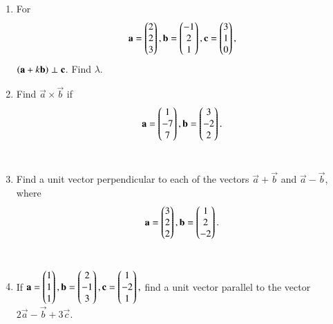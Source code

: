 \begin{enumerate}[label=\arabic*.,ref=\thesubsection.\theenumi]
\item For 
\begin{align}
\mathbf{a} = \begin{pmatrix}2\\2\\3\end{pmatrix}, \mathbf{b} = \begin{pmatrix}-1\\2\\1\end{pmatrix}, \mathbf{c} = \begin{pmatrix}3\\1\\0\end{pmatrix},
\end{align}
$\left(\mathbf{a}+k\mathbf{b}\right)\perp\mathbf{c}$.  Find $\lambda$.
\solution


\item Find ${\vec{a} \times \vec{b}}$ if 
\begin{align}
\mathbf{a}=\begin{pmatrix}1\\-7\\7\end{pmatrix},
\mathbf{b}=\begin{pmatrix}3\\-2\\2\end{pmatrix}.
\end{align}
\\
\solution 

\item Find a unit vector perpendicular to each of the vectors 
$\vec{a}+\vec{b}$ and $\vec{a}-\vec{b}$, where 
\begin{align}
\mathbf{a}=\begin{pmatrix}3\\2\\2\end{pmatrix},
\mathbf{b}=\begin{pmatrix}1\\2\\-2\end{pmatrix}.
\end{align}
\\
\solution 

\item  If 
$
\mathbf{a}=\begin{pmatrix}1\\1\\1\end{pmatrix},
\mathbf{b}=\begin{pmatrix}2\\-1\\3\end{pmatrix},
\mathbf{c}=\begin{pmatrix}1\\-2\\1\end{pmatrix},
$
find a unit vector parallel to the vector $2\vec{a}-\vec{b}+3\vec{c}$.
\\
\solution 



\end{enumerate}
